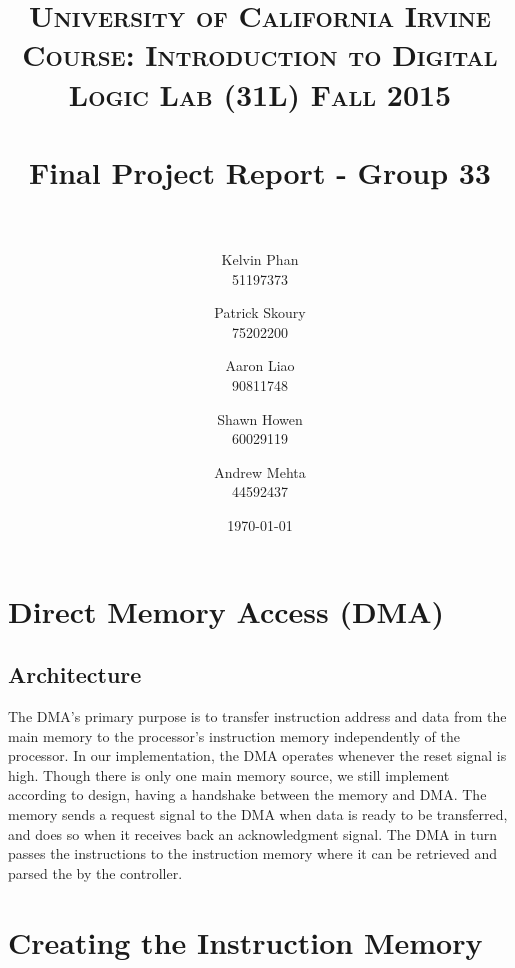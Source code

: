 \documentclass[paper=letter, fontsize=11pt]{scrartcl}
\title{	
\normalfont \normalsize 
\textsc{University of California Irvine} \\  %
\textsc{Course: Introduction to Digital Logic Lab (31L) Fall 2015} \\ [25pt]
\horrule{0.5pt} \\[0.4cm] %
\huge Final Project Report - Group 33\\ %
\horrule{2pt} \\[0.5cm] %
}
\author{Kelvin Phan \\ 51197373
	\and
	Patrick Skoury \\ 75202200
	\and
	Aaron Liao \\ 90811748
	\and
	Shawn Howen \\ 60029119
	\and
	Andrew Mehta \\ 44592437
}
\date{\large\today} %
\numberwithin{equation}{section} %
\numberwithin{figure}{section} %
\numberwithin{table}{section} %
\begin{document}
\maketitle %


\section{Direct Memory Access (DMA)}

\subsection{Architecture}
\begin{flushleft}
	The DMA's primary purpose is to transfer instruction address and data from the main memory to the processor's instruction memory independently of the processor. In our implementation, the DMA operates whenever the reset signal is high. Though there is only one main memory source, we still implement according to design, having a handshake between the memory and DMA. The memory sends a request signal to the DMA when data is ready to be transferred, and does so when it receives back an acknowledgment signal. The DMA in turn passes the instructions to the instruction memory where it can be retrieved and parsed the by the controller. \\[20pt]
\end{flushleft}


\section{Creating the Instruction Memory}
\end{document}
